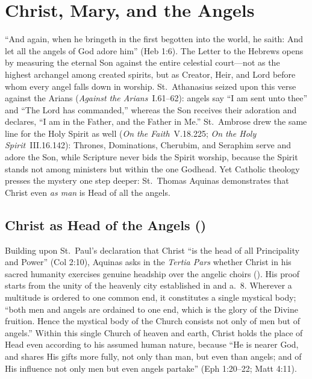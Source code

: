 \section{Christ, Mary, and the Angels}\label{sec:christ-mary-angels}

``And again, when he bringeth in the first begotten into the world, he saith: And let all the angels of God adore him'' (Heb 1:6). The Letter to the Hebrews opens by measuring the eternal Son against the entire celestial court---not as the highest archangel among created spirits, but as Creator, Heir, and Lord before whom every angel falls down in worship. St.~Athanasius seized upon this verse against the Arians (\emph{Against the Arians}~I.61--62): angels say ``I am sent unto thee'' and ``The Lord has commanded,'' whereas the Son receives their adoration and declares, ``I am in the Father, and the Father in Me.'' St.~Ambrose drew the same line for the Holy Spirit as well (\emph{On the Faith}~V.18.225; \emph{On the Holy Spirit}~III.16.142): Thrones, Dominations, Cherubim, and Seraphim serve and adore the Son, while Scripture never bids the Spirit worship, because the Spirit stands not among ministers but within the one Godhead. Yet Catholic theology presses the mystery one step deeper: St.~Thomas Aquinas demonstrates that Christ even \emph{as man} is Head of all the angels.

\subsection{Christ as Head of the Angels ()}

Building upon St.~Paul's declaration that Christ ``is the head of all Principality and Power'' (Col 2:10), Aquinas asks in the \emph{Tertia Pars} whether Christ in his sacred humanity exercises genuine headship over the angelic choirs (). His proof starts from the unity of the heavenly city established in  and a.~8. Wherever a multitude is ordered to one common end, it constitutes a single mystical body; ``both men and angels are ordained to one end, which is the glory of the Divine fruition. Hence the mystical body of the Church consists not only of men but of angels.'' Within this single Church of heaven and earth, Christ holds the place of Head even according to his assumed human nature, because ``He is nearer God, and shares His gifts more fully, not only than man, but even than angels; and of His influence not only men but even angels partake'' (Eph 1:20--22; Matt 4:11).

